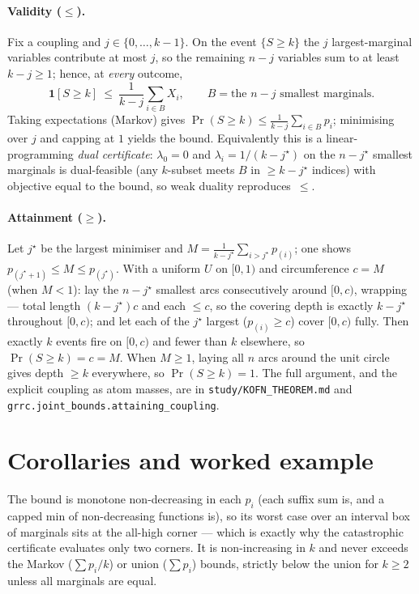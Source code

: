 \documentclass[11pt]{article}
\begin{document}
\paragraph{Validity ($\le$).} Fix a coupling and $j\in\{0,\dots,k-1\}$. On the
event $\{S\ge k\}$ the $j$ largest-marginal variables contribute at most $j$, so
the remaining $n-j$ variables sum to at least $k-j\ge 1$; hence, at \emph{every}
outcome,
\[
\mathbf 1[S\ge k]\ \le\ \frac{1}{k-j}\sum_{i\in B} X_i,
\qquad B=\text{the }n-j\text{ smallest marginals}.
\]
Taking expectations (Markov) gives $\Pr(S\ge k)\le \frac{1}{k-j}\sum_{i\in B}p_i$;
minimising over $j$ and capping at $1$ yields the bound. Equivalently this is a
linear-programming \emph{dual certificate}: $\lambda_0=0$ and
$\lambda_i=1/(k-j^\star)$ on the $n-j^\star$ smallest marginals is dual-feasible
(any $k$-subset meets $B$ in $\ge k-j^\star$ indices) with objective equal to the
bound, so weak duality reproduces~$\le$.

\paragraph{Attainment ($\ge$).} Let $j^\star$ be the largest minimiser and
$M=\frac{1}{k-j^\star}\sum_{i>j^\star}p_{(i)}$; one shows $p_{(j^\star+1)}\le M\le
p_{(j^\star)}$. With a uniform $U$ on $[0,1)$ and circumference $c=M$ (when $M<1$):
lay the $n-j^\star$ smallest arcs consecutively around $[0,c)$, wrapping --- total
length $(k-j^\star)c$ and each $\le c$, so the covering depth is exactly $k-j^\star$
throughout $[0,c)$; and let each of the $j^\star$ largest ($p_{(i)}\ge c$) cover
$[0,c)$ fully. Then exactly $k$ events fire on $[0,c)$ and fewer than $k$ elsewhere,
so $\Pr(S\ge k)=c=M$. When $M\ge 1$, laying all $n$ arcs around the unit circle
gives depth $\ge k$ everywhere, so $\Pr(S\ge k)=1$. The full argument, and the
explicit coupling as atom masses, are in \texttt{study/KOFN\_THEOREM.md} and
\texttt{grrc.joint\_bounds.attaining\_coupling}.

\section{Corollaries and worked example}
The bound is monotone non-decreasing in each $p_i$ (each suffix sum is, and a
capped min of non-decreasing functions is), so its worst case over an interval box
of marginals sits at the all-high corner --- which is exactly why the catastrophic
certificate evaluates only two corners. It is non-increasing in $k$ and never
exceeds the Markov ($\sum p_i/k$) or union ($\sum p_i$) bounds, strictly below the
union for $k\ge 2$ unless all marginals are equal.
\end{document}
